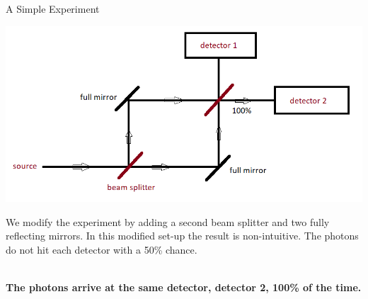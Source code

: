 \documentclass[svgnames,smaller,aspectratio=169]{beamer}
\begin{document}
\begin{frame}[fragile]{A Simple Experiment}
  \begin{center}
      \includegraphics[height=.4\textheight]{exp2}
  \end{center}
  We modify the experiment by adding a second beam splitter and two fully reflecting mirrors.
  In this modified set-up the result is non-intuitive. The photons do not hit each detector with a 50\% chance. \\~\

  \textbf{The photons arrive at the same detector, detector 2, 100\% of the time.}

\end{frame}
\end{document}
